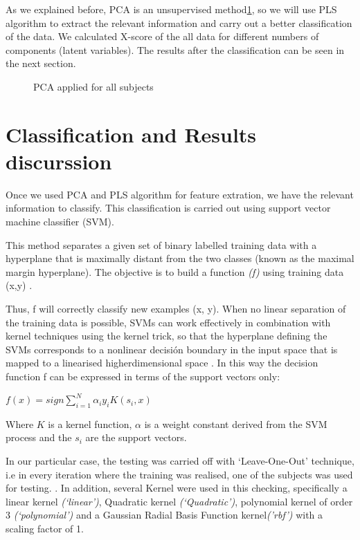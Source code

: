 As we explained before, PCA is an unsupervised method\ref{fig:PCA}, so we will use PLS algorithm to extract the relevant information and carry out a better classification of the data. We calculated X-score of the all data for different numbers of components (latent variables). The results after the classification can be seen in the next section.

\begin{figure}[H]
	\centering
	\caption{PCA applied for all subjects}
	\label{fig:PCA}
\end{figure}

\section{Classification and Results discurssion}

Once we used PCA and PLS algorithm for feature extration, we have the relevant information to classify. This classification is carried out using support vector machine classifier (SVM).

This method separates a given set of binary labelled training data with a hyperplane that is maximally distant from the two classes (known as the maximal margin hyperplane). The objective is to build a function \textit{(f)} using training data (x,y) \cite{Gorriz}.
 
Thus, f will correctly classify new examples (x, y). When no linear separation of the training data is possible, SVMs can work effectively in combination with kernel techniques using the kernel trick, so that the hyperplane defining the SVMs corresponds to a nonlinear decisión boundary in the input space that is mapped to a linearised higherdimensional space . In this way the decision function f can be expressed in terms of the support vectors only\cite{Gorriz}:

\begin{center}
	$f(x) = sign{\sum_{i=1}^{N} \alpha_{i}y_{i}K(s_{i},x)}$
\end{center}

Where $K$ is a kernel function, $\alpha$ is a weight constant derived from the SVM process and the $s_{i}$ are the support vectors. 

In our particular case, the testing was carried off with ‘Leave-One-Out’ technique, i.e in every iteration where the training was realised, one of the subjects was used for testing. . In addition, several Kernel were used in this checking, specifically a linear kernel \textit{(‘linear’)}, Quadratic kernel \textit{(‘Quadratic’)}, polynomial kernel of order 3 \textit{(‘polynomial’)} and a Gaussian Radial Basis Function kernel\textit{('rbf')} with a scaling factor of 1.

